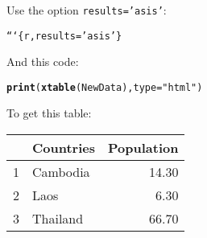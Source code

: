 \documentclass{beamer}\usepackage{graphicx, color}
\makeatletter
\newcommand{\hlfunctioncall}[1]{\textcolor[rgb]{0.501960784313725,0,0.329411764705882}{\textbf{#1}}}%
\newcommand{\hlstring}[1]{\textcolor[rgb]{0.6,0.6,1}{#1}}%
\newenvironment{kframe}{%
 \def\at@end@of@kframe{}%
 \ifinner\ifhmode%
  \def\at@end@of@kframe{\end{minipage}}%
  \begin{minipage}{\columnwidth}%
 \fi\fi%
 \def\FrameCommand##1{\hskip\@totalleftmargin \hskip-\fboxsep
 \colorbox{shadecolor}{##1}\hskip-\fboxsep
     \hskip-\linewidth \hskip-\@totalleftmargin \hskip\columnwidth}%
 \MakeFramed {\advance\hsize-\width
   \@totalleftmargin\z@ \linewidth\hsize
   \@setminipage}}%
 {\par\unskip\endMakeFramed%
 \at@end@of@kframe}
\newenvironment{knitrout}{}{} %
\makeatother
\begin{document}
\begin{frame}[fragile]
  \frametitle{}
  {\Large{Use the option \texttt{results='asis'}}}:
\begin{knitrout}
\color{fgcolor}\begin{kframe}
\begin{alltt}
```\{r, results=\hlstring{'asis'}\}
\end{alltt}
\end{kframe}
\end{knitrout}


  {\Large{And this code}}:
\begin{knitrout}
\color{fgcolor}\begin{kframe}
\begin{alltt}
\hlfunctioncall{print}(\hlfunctioncall{xtable}(NewData), type = \hlstring{"html"})
\end{alltt}
\end{kframe}
\end{knitrout}

  {\Large{To get this table}}:

\begin{table}[ht]
\begin{center}
\begin{tabular}{rlr}
  \hline
 & Countries & Population \\ 
  \hline
1 & Cambodia & 14.30 \\ 
  2 & Laos & 6.30 \\ 
  3 & Thailand & 66.70 \\ 
   \hline
\end{tabular}
\end{center}
\end{table}



\end{frame}

\end{document}
